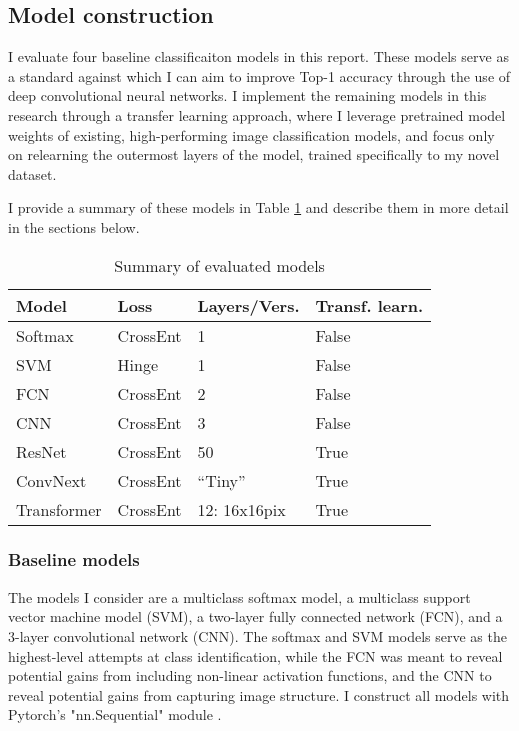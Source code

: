 \documentclass[10pt,twocolumn,letterpaper]{article}
\begin{document}
\subsection{Model construction}
\label{sec:models}
I evaluate four baseline classificaiton models in this report. These models serve as a standard against which I can aim to improve Top-1 accuracy through the use of deep convolutional neural networks. I implement the remaining models in this research through a transfer learning approach, where I leverage pretrained model weights of existing, high-performing image classification models, and focus only on relearning the outermost layers of the model, trained specifically to my novel dataset.

I provide a summary of these models in Table \ref{tab:model_desc} and describe them in more detail in the sections below.

\begin{table}[!htbp]
  \begin{center}
    \small
  \begin{tabular}{|l|l|l|l|}
  \hline
  Model & Loss & Layers/Vers. & Transf. learn.\\
  \hline\hline
  Softmax & CrossEnt & 1 & False \\
  SVM & Hinge & 1 & False \\
  FCN & CrossEnt & 2 & False \\
  CNN & CrossEnt & 3 & False \\
  ResNet & CrossEnt & 50 & True \\
  ConvNext & CrossEnt & ``Tiny'' & True \\
  Transformer & CrossEnt & 12: 16x16pix & True \\
  \hline
  \end{tabular}
  \end{center}
  \caption{\label{tab:model_desc} Summary of evaluated models}
  \end{table}

\subsubsection{Baseline models}
The models I consider are a multiclass softmax model, a multiclass support vector machine model (SVM), a two-layer fully connected network (FCN), and a 3-layer convolutional network (CNN). The softmax and SVM models serve as the highest-level attempts at class identification, while the FCN was meant to reveal potential gains from including non-linear activation functions, and the CNN to reveal potential gains from capturing image structure. I construct all models with Pytorch's "nn.Sequential" module \cite{PyTorch}.
\end{document}
